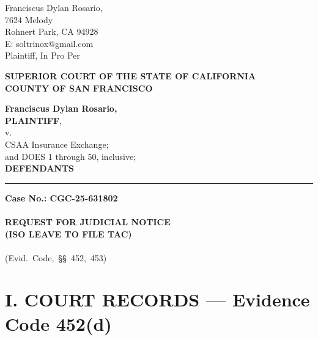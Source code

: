 

\nolinenumbers
\begin{singlespace}
Franciscus Dylan Rosario, \\
7624 Melody \\
Rohnert Park, CA 94928 \\
E: soltrinox@gmail.com \\
Plaintiff, In Pro Per \\
\end{singlespace}
\vspace*{9mm}
\begin{tightcenter}
\textbf{SUPERIOR COURT OF THE STATE OF CALIFORNIA} \\
\textbf{COUNTY OF SAN FRANCISCO}
\end{tightcenter}
\vspace*{2.25mm}
\nolinenumbers
\begin{minipage}[t]{3in}
    \raggedright
    \textbf{Franciscus Dylan Rosario,} \\ \textbf{PLAINTIFF}, \\
    \hspace{1cm} v. \\
    \small
    CSAA Insurance Exchange; \\
    and DOES 1 through 50, inclusive; \\
    \normalsize
    \textbf{DEFENDANTS}
    \makebox[3in]{\hrulefill}
\end{minipage}%
\hspace{3mm}
\begin{minipage}[t]{0.5pt}
    \vspace{0pt}
    \rule{0.5pt}{2.0in}
\end{minipage}
\hspace{3mm}
\begin{minipage}[t]{3in}
    \raggedright
    \noindent \textbf{Case No.: CGC-25-631802} \\
    ~\\
    \textbf{REQUEST FOR JUDICIAL NOTICE} \\
    \textbf{(ISO LEAVE TO FILE TAC)} \\
    ~\\
    \mbox{(Evid. Code, \S\S\ 452, 453)}
\end{minipage}
\vspace*{6mm}
\linenumbers
\section{I. COURT RECORDS --- Evidence Code \textsection{} 452(d)}\label{i.-court-records-evidence-code-452d}

